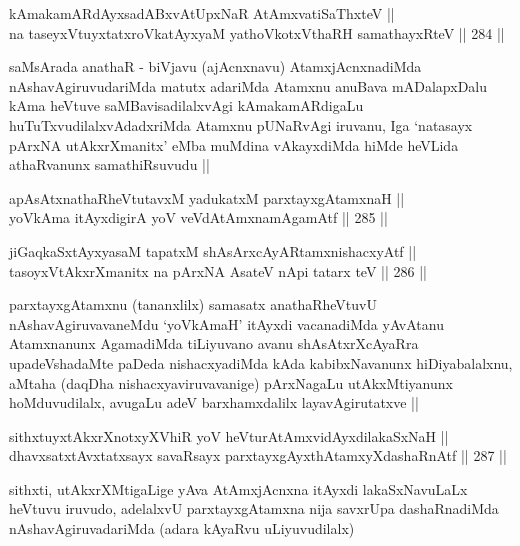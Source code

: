 \begin{shl}
kAmakamARdAyxsadABxvAtUpxNaR AtAmx\s vatiSaThxteV ||  \\
na taseyxVtuyxtatxroVkatAyx\s yaM yathoVkotxV\s thaRH samathayxRteV ||  284 ||  
\end{shl}

\begin{artha}
saMsArada anathaR - biVjavu (ajAcnxnavu) AtamxjAcnxnadiMda
nAshavAgiruvudariMda matutx adariMda Atamxnu anuBava mADalapxDalu kAma
heVtuve saMBavisadilalxvAgi kAmakamARdigaLu huTuTxvudilalxvAdadxriMda
Atamxnu pUNaRvAgi iruvanu, Iga `natasayx pArxNA utAkxrXmanitx' eMba
muMdina vAkayxdiMda hiMde heVLida athaRvanunx samathiRsuvudu ||
\end{artha}

\begin{shl}
apAsAtxnathaRheVtutavxM yadukatxM parxtayxgAtamxnaH || \\
yoV\s kAma itAyxdigirA yoV veVdA\s \s tAmxnamAgamAtf ||  285 ||  
\end{shl}
				
\begin{shl}
jiGaqkaSxtAyxyasaM tapatxM shAsArxcAyARtamxnishacxyAtf ||  \\
tasoyxVtAkxrXmanitx na pArxNA AsateV nApi tatarx teV ||  286 ||  
\end{shl}

\begin{artha}
parxtayxgAtamxnu (tananxlilx) samasatx anathaRheVtuvU
nAshavAgiruvavaneMdu `yoV\s kAmaH' itAyxdi vacanadiMda yAvAtanu
Atamxnanunx AgamadiMda tiLiyuvano avanu shAsAtxrXcAyaRra
upadeVshadaMte paDeda nishacxyadiMda kAda kabibxNavanunx
hiDiyabalalxnu, aMtaha (daqDha nishacxyaviruvavanige) pArxNagaLu
utAkxMtiyanunx hoMduvudilalx, avugaLu adeV barxhamxdalilx
layavAgirutatxve ||
\end{artha}


\begin{shl}
sithxtuyxtAkxrXnotxyXVhiR yoV heVturAtAmxvidAyxdilakaSxNaH || \\
dhavxsatxtAvxtatxsayx savaRsayx parxtayxgAyxthAtamxyXdashaRnAtf ||  287 ||  
\end{shl}

\begin{artha}
sithxti, utAkxrXMtigaLige yAva AtAmxjAcnxna itAyxdi lakaSxNavuLaLx
heVtuvu iruvudo, adelalxvU parxtayxgAtamxna nija savxrUpa
dashaRnadiMda nAshavAgiruvadariMda (adara kAyaRvu uLiyuvudilalx)
\end{artha}

